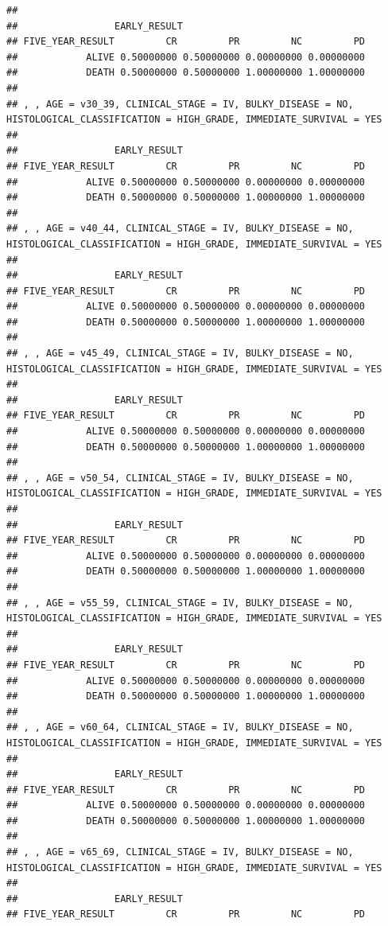 \documentclass[]{article}
\begin{document}
\begin{verbatim}
## 
##                 EARLY_RESULT
## FIVE_YEAR_RESULT         CR         PR         NC         PD
##            ALIVE 0.50000000 0.50000000 0.00000000 0.00000000
##            DEATH 0.50000000 0.50000000 1.00000000 1.00000000
## 
## , , AGE = v30_39, CLINICAL_STAGE = IV, BULKY_DISEASE = NO, HISTOLOGICAL_CLASSIFICATION = HIGH_GRADE, IMMEDIATE_SURVIVAL = YES
## 
##                 EARLY_RESULT
## FIVE_YEAR_RESULT         CR         PR         NC         PD
##            ALIVE 0.50000000 0.50000000 0.00000000 0.00000000
##            DEATH 0.50000000 0.50000000 1.00000000 1.00000000
## 
## , , AGE = v40_44, CLINICAL_STAGE = IV, BULKY_DISEASE = NO, HISTOLOGICAL_CLASSIFICATION = HIGH_GRADE, IMMEDIATE_SURVIVAL = YES
## 
##                 EARLY_RESULT
## FIVE_YEAR_RESULT         CR         PR         NC         PD
##            ALIVE 0.50000000 0.50000000 0.00000000 0.00000000
##            DEATH 0.50000000 0.50000000 1.00000000 1.00000000
## 
## , , AGE = v45_49, CLINICAL_STAGE = IV, BULKY_DISEASE = NO, HISTOLOGICAL_CLASSIFICATION = HIGH_GRADE, IMMEDIATE_SURVIVAL = YES
## 
##                 EARLY_RESULT
## FIVE_YEAR_RESULT         CR         PR         NC         PD
##            ALIVE 0.50000000 0.50000000 0.00000000 0.00000000
##            DEATH 0.50000000 0.50000000 1.00000000 1.00000000
## 
## , , AGE = v50_54, CLINICAL_STAGE = IV, BULKY_DISEASE = NO, HISTOLOGICAL_CLASSIFICATION = HIGH_GRADE, IMMEDIATE_SURVIVAL = YES
## 
##                 EARLY_RESULT
## FIVE_YEAR_RESULT         CR         PR         NC         PD
##            ALIVE 0.50000000 0.50000000 0.00000000 0.00000000
##            DEATH 0.50000000 0.50000000 1.00000000 1.00000000
## 
## , , AGE = v55_59, CLINICAL_STAGE = IV, BULKY_DISEASE = NO, HISTOLOGICAL_CLASSIFICATION = HIGH_GRADE, IMMEDIATE_SURVIVAL = YES
## 
##                 EARLY_RESULT
## FIVE_YEAR_RESULT         CR         PR         NC         PD
##            ALIVE 0.50000000 0.50000000 0.00000000 0.00000000
##            DEATH 0.50000000 0.50000000 1.00000000 1.00000000
## 
## , , AGE = v60_64, CLINICAL_STAGE = IV, BULKY_DISEASE = NO, HISTOLOGICAL_CLASSIFICATION = HIGH_GRADE, IMMEDIATE_SURVIVAL = YES
## 
##                 EARLY_RESULT
## FIVE_YEAR_RESULT         CR         PR         NC         PD
##            ALIVE 0.50000000 0.50000000 0.00000000 0.00000000
##            DEATH 0.50000000 0.50000000 1.00000000 1.00000000
## 
## , , AGE = v65_69, CLINICAL_STAGE = IV, BULKY_DISEASE = NO, HISTOLOGICAL_CLASSIFICATION = HIGH_GRADE, IMMEDIATE_SURVIVAL = YES
## 
##                 EARLY_RESULT
## FIVE_YEAR_RESULT         CR         PR         NC         PD

\end{verbatim}
\end{document}
